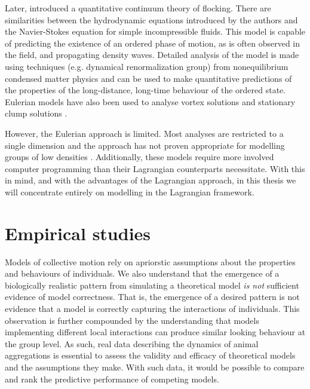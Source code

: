 Later, \textcite{toner98} introduced a quantitative continuum theory of
flocking. There are similarities between the hydrodynamic equations introduced
by the authors and the Navier-Stokes equation for simple incompressible fluids.
This model is capable of predicting the existence of an ordered phase of
motion, as is often observed in the field, and propagating density waves.
Detailed analysis of the model is made using techniques (e.g. dynamical
renormalization group) from nonequilibrium condensed matter physics and can be
used to make quantitative predictions of the properties of the long-distance,
long-time behaviour of the ordered state. Eulerian models have also been used
to analyse vortex solutions \parencite{topaz04} and stationary clump solutions
\parencite{topaz06}.

However, the Eulerian approach is limited. Most analyses are restricted to a
single dimension and the approach has not proven appropriate for modelling
groups of low densities \parencite{giardina08}. Additionally, these models
require more involved computer programming than their Lagrangian counterparts
necessitate. With this in mind, and with the advantages of the Lagrangian
approach, in this thesis we will concentrate entirely on modelling in the
Lagrangian framework.

\section{Empirical studies}
\label{sec:empirical_studies}

Models of collective motion rely on apriorstic assumptions about the properties
and behaviours of individuals. We also understand that the emergence of a
biologically realistic pattern from simulating a theoretical model \emph{is
not} sufficient evidence of model correctness. That is, the emergence of a
desired pattern is not evidence that a model is correctly capturing the
interactions of individuals. This observation is further compounded by the
understanding that models implementing different local interactions can produce
similar looking behaviour at the group level. As such, real data describing the
dynamics of animal aggregations is essential to assess the validity and
efficacy of theoretical models and the assumptions they make. With such data,
it would be possible to compare and rank the predictive performance of
competing models.

